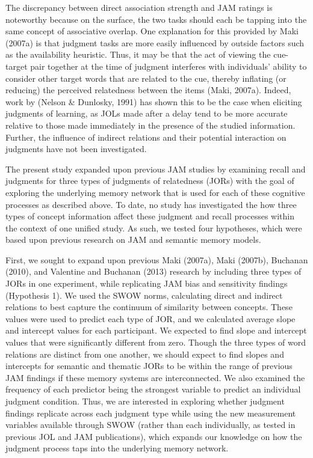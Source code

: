 \documentclass[english,,man]{apa6}
\begin{document}
The discrepancy between direct association strength and JAM ratings is noteworthy because on the surface, the two tasks should each be tapping into the same concept of associative overlap. One explanation for this provided by Maki (2007a) is that judgment tasks are more easily influenced by outside factors such as the availability heuristic. Thus, it may be that the act of viewing the cue-target pair together at the time of judgment interferes with individuals' ability to consider other target words that are related to the cue, thereby inflating (or reducing) the perceived relatedness between the items (Maki, 2007a). Indeed, work by (Nelson \& Dunlosky, 1991) has shown this to be the case when eliciting judgments of learning, as JOLs made after a delay tend to be more accurate relative to those made immediately in the presence of the studied information. Further, the influence of indirect relations and their potential interaction on judgments have not been investigated.

The present study expanded upon previous JAM studies by examining recall and judgments for three types of judgments of relatedness (JORs) with the goal of exploring the underlying memory network that is used for each of these cognitive processes as described above. To date, no study has investigated the how three types of concept information affect these judgment and recall processes within the context of one unified study. As such, we tested four hypotheses, which were based upon previous research on JAM and semantic memory models.

First, we sought to expand upon previous Maki (2007a), Maki (2007b), Buchanan (2010), and Valentine and Buchanan (2013) research by including three types of JORs in one experiment, while replicating JAM bias and sensitivity findings (Hypothesis 1). We used the SWOW norms, calculating direct and indirect relations to best capture the continuum of similarity between concepts. These values were used to predict each type of JOR, and we calculated average slope and intercept values for each participant. We expected to find slope and intercept values that were significantly different from zero. Though the three types of word relations are distinct from one another, we should expect to find slopes and intercepts for semantic and thematic JORs to be within the range of previous JAM findings if these memory systems are interconnected. We also examined the frequency of each predictor being the strongest variable to predict an individual judgment condition. Thus, we are interested in exploring whether judgment findings replicate across each judgment type while using the new measurement variables available through SWOW (rather than each individually, as tested in previous JOL and JAM publications), which expands our knowledge on how the judgment process taps into the underlying memory network.
\end{document}
